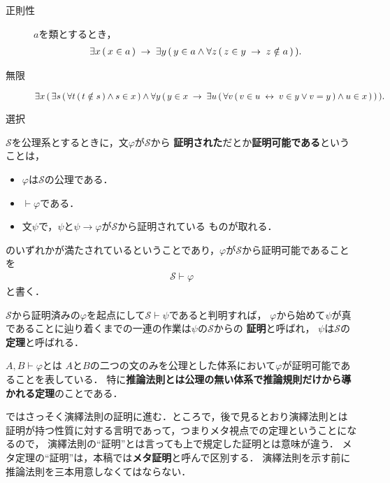 \begin{description}
		\item[正則性] $a$を類とするとき，
			\begin{align}
				\exists x\, (\, x \in a\, ) \hspace{0.25em}\rightarrow\hspace{0.25em}
				\exists y\, (\, y \in a \wedge \forall z\, (\, z \in y \hspace{0.25em}\rightarrow\hspace{0.25em}
				z \notin a\, )\, ).
			\end{align}
			
		\item[無限] $\exists x\, (\, 
				\exists s\, (\, \forall t\, (\, t \notin s\, ) \wedge s \in x\, ) 
				\wedge \forall y\, (\, 
				y \in x \hspace{0.25em}\rightarrow\hspace{0.25em} \exists u\, (\, 
				\forall v\, (\, v \in u \hspace{0.25em}\leftrightarrow\hspace{0.25em} v \in y \vee v = y\, )
				\wedge u \in x\, )\, )\, ).$
			
		\item[選択]
			
	\end{description}
	
	$\mathscr{S}$を公理系とするときに，文$\varphi$が$\mathscr{S}$から
	{\bf 証明された}だとか{\bf 証明可能である}ということは，
	\begin{itemize}
		\item $\varphi$は$\mathscr{S}$の公理である．
		\item $\vdash \varphi$である．
		\item 文$\psi$で，$\psi$と$\psi \rightarrow \varphi$が$\mathscr{S}$から証明されている
			ものが取れる．
	\end{itemize}
	
	のいずれかが満たされているということであり，$\varphi$が$\mathscr{S}$から証明可能であることを
	\begin{align}
		\mathscr{S} \vdash \varphi
	\end{align}
	と書く．
	
	$\mathscr{S}$から証明済みの$\varphi$を起点にして$\mathscr{S} \vdash \psi$であると判明すれば，
	$\varphi$から始めて$\psi$が真であることに辿り着くまでの一連の作業は$\psi$の$\mathscr{S}$からの
	{\bf 証明}と呼ばれ，
	$\psi$は$\mathscr{S}$の{\bf 定理}と呼ばれる．
	
	$A,B \vdash \varphi$とは
	$A$と$B$の二つの文のみを公理とした体系において$\varphi$が証明可能であることを表している．
	特に{\bf 推論法則とは公理の無い体系で推論規則だけから導かれる定理}のことである．
	
	ではさっそく演繹法則の証明に進む．ところで，後で見るとおり演繹法則とは
	証明が持つ性質に対する言明であって，つまりメタ視点での定理ということになるので，
	演繹法則の``証明''とは言っても上で規定した証明とは意味が違う．
	メタ定理の``証明''は，本稿では{\bf メタ証明}と呼んで区別する．
	演繹法則を示す前に推論法則を三本用意しなくてはならない．
	
